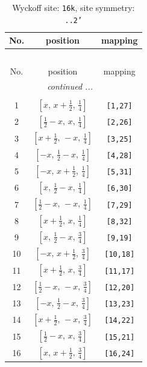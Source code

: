 \documentclass[fleqn,8pt]{jsarticle}
\begin{document}
\begin{longtable}{ccc}
\caption{Wyckoff site: {\tt 16k}, site symmetry: {\tt ..2'}}
 \\
 \hline \hline
No. & position & mapping \\ \hline \endfirsthead

\multicolumn{2}{l}{\tablename\ \thetable{}} \\
 \hline \hline
No. & position & mapping \\ \hline \endhead

 \hline \hline
\multicolumn{2}{r}{\footnotesize\it continued ...} \\ \endfoot

 \hline \hline
\multicolumn{2}{r}{} \\ \endlastfoot

1 & $\left[ x,\, x + \frac{1}{2},\, \frac{1}{4} \right]$ & {\tt [1,27]} \\ \hline
2 & $\left[ \frac{1}{2} - x,\, x,\, \frac{1}{4} \right]$ & {\tt [2,26]} \\ \hline
3 & $\left[ x + \frac{1}{2},\, - x,\, \frac{1}{4} \right]$ & {\tt [3,25]} \\ \hline
4 & $\left[ - x,\, \frac{1}{2} - x,\, \frac{1}{4} \right]$ & {\tt [4,28]} \\ \hline
5 & $\left[ - x,\, x + \frac{1}{2},\, \frac{1}{4} \right]$ & {\tt [5,31]} \\ \hline
6 & $\left[ x,\, \frac{1}{2} - x,\, \frac{1}{4} \right]$ & {\tt [6,30]} \\ \hline
7 & $\left[ \frac{1}{2} - x,\, - x,\, \frac{1}{4} \right]$ & {\tt [7,29]} \\ \hline
8 & $\left[ x + \frac{1}{2},\, x,\, \frac{1}{4} \right]$ & {\tt [8,32]} \\ \hline
9 & $\left[ x,\, \frac{1}{2} - x,\, \frac{3}{4} \right]$ & {\tt [9,19]} \\ \hline
10 & $\left[ - x,\, x + \frac{1}{2},\, \frac{3}{4} \right]$ & {\tt [10,18]} \\ \hline
11 & $\left[ x + \frac{1}{2},\, x,\, \frac{3}{4} \right]$ & {\tt [11,17]} \\ \hline
12 & $\left[ \frac{1}{2} - x,\, - x,\, \frac{3}{4} \right]$ & {\tt [12,20]} \\ \hline
13 & $\left[ - x,\, \frac{1}{2} - x,\, \frac{3}{4} \right]$ & {\tt [13,23]} \\ \hline
14 & $\left[ x + \frac{1}{2},\, - x,\, \frac{3}{4} \right]$ & {\tt [14,22]} \\ \hline
15 & $\left[ \frac{1}{2} - x,\, x,\, \frac{3}{4} \right]$ & {\tt [15,21]} \\ \hline
16 & $\left[ x,\, x + \frac{1}{2},\, \frac{3}{4} \right]$ & {\tt [16,24]} \\
\end{longtable}
\end{document}
